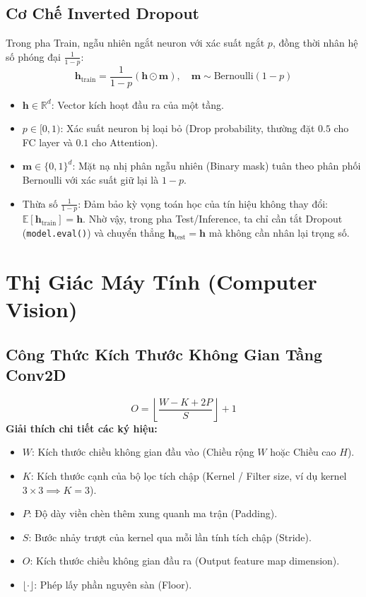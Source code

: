 \documentclass[10pt,a4paper]{article}
\begin{document}
\subsection{Cơ Chế Inverted Dropout}
Trong pha Train, ngẫu nhiên ngắt neuron với xác suất ngắt $p$, đồng thời nhân hệ số phóng đại $\frac{1}{1-p}$:
\begin{equation}
    \mathbf{h}_{\text{train}} = \frac{1}{1 - p} (\mathbf{h} \odot \mathbf{m}), \quad \mathbf{m} \sim \text{Bernoulli}(1 - p)
\end{equation}
\begin{itemize}[leftmargin=*]
    \item $\mathbf{h} \in \mathbb{R}^d$: Vector kích hoạt đầu ra của một tầng.
    \item $p \in [0, 1)$: Xác suất neuron bị loại bỏ (Drop probability, thường đặt $0.5$ cho FC layer và $0.1$ cho Attention).
    \item $\mathbf{m} \in \{0, 1\}^d$: Mặt nạ nhị phân ngẫu nhiên (Binary mask) tuân theo phân phối Bernoulli với xác suất giữ lại là $1 - p$.
    \item Thừa số $\frac{1}{1-p}$: Đảm bảo kỳ vọng toán học của tín hiệu không thay đổi: $\mathbb{E}[\mathbf{h}_{\text{train}}] = \mathbf{h}$. Nhờ vậy, trong pha Test/Inference, ta chỉ cần tắt Dropout (\texttt{model.eval()}) và chuyển thẳng $\mathbf{h}_{\text{test}} = \mathbf{h}$ mà không cần nhân lại trọng số.
\end{itemize}

\section{Thị Giác Máy Tính (Computer Vision)}

\subsection{Công Thức Kích Thước Không Gian Tầng Conv2D}
\begin{equation}
    O = \left\lfloor \frac{W - K + 2P}{S} \right\rfloor + 1
\end{equation}
\textbf{Giải thích chi tiết các ký hiệu:}
\begin{itemize}[leftmargin=*]
    \item $W$: Kích thước chiều không gian đầu vào (Chiều rộng $W$ hoặc Chiều cao $H$).
    \item $K$: Kích thước cạnh của bộ lọc tích chập (Kernel / Filter size, ví dụ kernel $3 \times 3 \implies K = 3$).
    \item $P$: Độ dày viền chèn thêm xung quanh ma trận (Padding).
    \item $S$: Bước nhảy trượt của kernel qua mỗi lần tính tích chập (Stride).
    \item $O$: Kích thước chiều không gian đầu ra (Output feature map dimension).
    \item $\lfloor \cdot \rfloor$: Phép lấy phần nguyên sàn (Floor).
\end{itemize}
\end{document}
